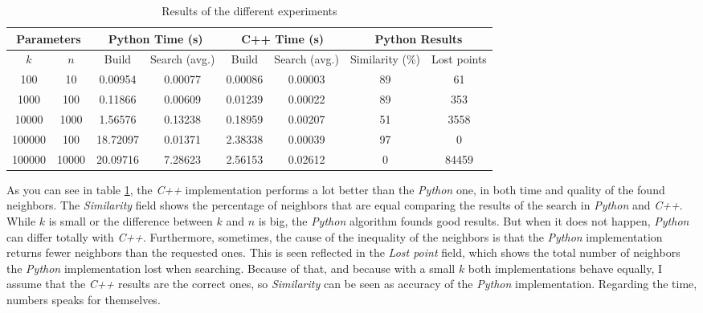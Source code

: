 \documentclass[a4paper, 10pt]{article}
\begin{document}
\begin{table}[hbtp]
	\centering
	\begin{tabular}{|c| c| c| c | c |c|c|c|}
		\hline
		\multicolumn{2}{|c|}{Parameters} & \multicolumn{2}{c|}{Python Time (s)} & \multicolumn{2}{c|}{C++ Time (s)} & \multicolumn{2}{c|}{Python Results} \\ \hline
		$k$ & $n$ & Build & Search (avg.) & Build & Search (avg.) & Similarity (\%) & Lost points\\ \hline
		100 & 10 & 0.00954 & 0.00077 & 0.00086 & 0.00003 & 89 & 61 \\
		1000 & 100 & 0.11866 & 0.00609 & 0.01239 & 0.00022 & 89 & 353 \\
		10000 & 1000 & 1.56576 & 0.13238 & 0.18959 & 0.00207 & 51 & 3558 \\
		100000 & 100 & 18.72097 & 0.01371 & 2.38338 & 0.00039 & 97 & 0 \\
		100000 & 10000 & 20.09716 & 7.28623 & 2.56153 & 0.02612 & 0 & 84459 \\
		\hline
	\end{tabular}
	\caption{Results of the different experiments}
	\label{tab:res}
\end{table}

As you can see in table \ref{tab:res}, the \textit{C++} implementation performs a lot better than the \textit{Python} one, in both time and quality of the found neighbors. The \textit{Similarity} field shows the percentage of neighbors that are equal comparing the results of the search in \textit{Python} and \textit{C++}. While $k$ is small or the difference between $k$ and $n$ is big, the \textit{Python} algorithm founds good results. But when it does not happen, \textit{Python} can differ totally with \textit{C++}. Furthermore, sometimes, the cause of the inequality of the neighbors is that the \textit{Python} implementation returns fewer neighbors than the requested ones. This is seen reflected in the \textit{Lost point} field, which shows the total number of neighbors the \textit{Python} implementation lost when searching. Because of that, and because with a small $k$ both implementations behave equally, I assume that the \textit{C++} results are the correct ones, so \textit{Similarity} can be seen as accuracy of the \textit{Python} implementation. Regarding the time, numbers speaks for themselves.



\end{document}
